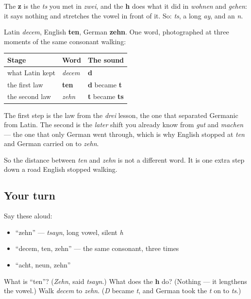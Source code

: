 The \textbf{z} is the \emph{ts} you met in \emph{zwei}, and the \textbf{h} does what it did in \emph{wohnen} and \emph{gehen}: it says nothing and stretches the vowel in front of it. So: \emph{ts}, a long \emph{ay}, and an \emph{n}.

\begin{cousinweb}
Latin \emph{decem}, English \textbf{ten}, German \textbf{zehn}. One word, photographed at three moments of the same consonant walking:

\noindent
\begin{tabularx}{\linewidth}{@{}>{\raggedright\arraybackslash}X>{\raggedright\arraybackslash}X>{\raggedright\arraybackslash}X@{}}
\toprule
\textbf{Stage} & \textbf{Word} & \textbf{The sound} \\
\midrule
what Latin kept & \emph{decem} & \textbf{d} \\
the first law & \textbf{ten} & \textbf{d} became \textbf{t} \\
the second law & \emph{zehn} & \textbf{t} became \textbf{ts} \\
\bottomrule
\end{tabularx}

The first step is the law from the \emph{drei} lesson, the one that separated Germanic from Latin. The second is the \emph{later} shift you already know from \emph{gut} and \emph{machen} — the one that only German went through, which is why English stopped at \emph{ten} and German carried on to \emph{zehn}.

So the distance between \emph{ten} and \emph{zehn} is not a different word. It is one extra step down a road English stopped walking.
\end{cousinweb}

\subsection*{Your turn}
Say these aloud:

\begin{itemize}
\raggedright
  \item \textquotedblleft{}zehn\textquotedblright{} — \emph{tsayn}, long vowel, silent \emph{h}
  \item \textquotedblleft{}decem, ten, zehn\textquotedblright{} — the same consonant, three times
  \item \textquotedblleft{}acht, neun, zehn\textquotedblright{}
\end{itemize}

\begin{tcolorbox}[breakable,colback=teal!4,colframe=teal!35!black,title={Before you move on}]
What is \textquotedblleft{}ten\textquotedblright{}? (\emph{Zehn}, said \emph{tsayn}.) What does the \textbf{h} do? (Nothing — it lengthens the vowel.) Walk \emph{decem} to \emph{zehn}. (\emph{D} became \emph{t}, and German took the \emph{t} on to \emph{ts}.)
\end{tcolorbox}
